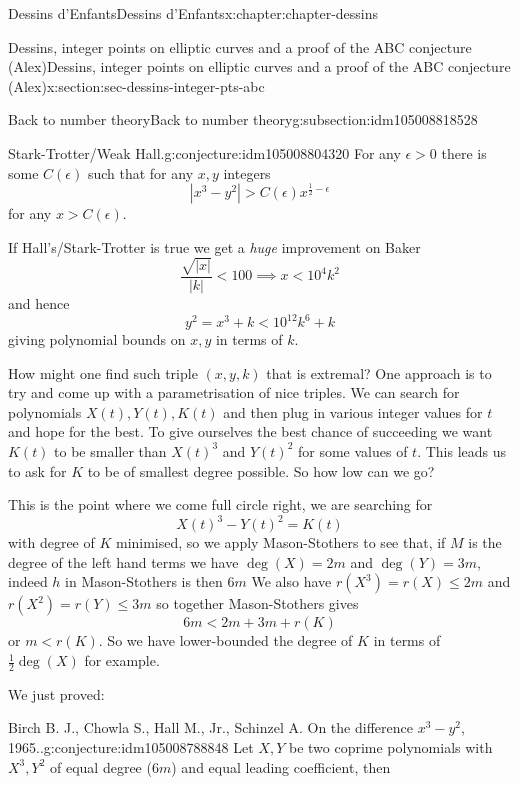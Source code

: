 \documentclass[oneside,10pt,]{book}
\numberwithin{equation}{section}
\newcommand{\lt}{<}
\newcommand{\gt}{>}
\begin{document}
\begin{chapterptx}{Dessins d'Enfants}{}{Dessins d'Enfants}{}{}{x:chapter:chapter-dessins}
\begin{sectionptx}{Dessins, integer points on elliptic curves and a proof of the ABC conjecture (Alex)}{}{Dessins, integer points on elliptic curves and a proof of the ABC conjecture (Alex)}{}{}{x:section:sec-dessins-integer-pts-abc}
\begin{subsectionptx}{Back to number theory}{}{Back to number theory}{}{}{g:subsection:idm105008818528}
\begin{conjecture}{Stark-Trotter\slash{}Weak Hall.}{}{g:conjecture:idm105008804320}%
For any  \(\epsilon \gt 0\) there is some \(C(\epsilon)\) such that for any \(x,y\) integers%
\begin{equation*}
|x^3 - y^2| \gt C(\epsilon) x^{\frac12 - \epsilon}
\end{equation*}
for any \(x \gt C(\epsilon)\).%
\end{conjecture}
If Hall's\slash{}Stark-Trotter is true we get a \emph{huge} improvement on Baker%
\begin{equation*}
\frac{\sqrt{|x|}}{|k|} \lt 100 \implies x \lt 10^4k^2
\end{equation*}
and hence%
\begin{equation*}
y^2 = x^3 + k \lt 10^{12}k^6 + k
\end{equation*}
giving polynomial bounds on \(x,y\) in terms of \(k\).%
\par
How might one find such triple \((x,y,k)\) that is extremal? One approach is to try and come up with a parametrisation of nice triples. We can search for polynomials \(X(t),Y(t), K(t)\) and then plug in various integer values for \(t\) and hope for the best. To give ourselves the best chance of succeeding we want \(K(t)\) to be smaller than \(X(t)^3\) and \(Y(t)^2\) for some values of \(t\). This leads us to ask for \(K\) to be of smallest degree possible. So how low can we go?%
\par
This is the point where we come full circle right, we are searching for%
\begin{equation*}
X(t)^3 - Y(t)^2 = K(t)
\end{equation*}
with degree of \(K\) minimised, so we apply Mason-Stothers to see that, if \(M\) is the degree of the left hand terms we have \(\deg(X) = 2m\) and \(\deg (Y) = 3m\), indeed \(h\) in Mason-Stothers is then \(6m\) We also have \(r(X^3) = r(X) \le 2m\) and \(r(X^2) = r(Y) \le 3m\) so together Mason-Stothers gives%
\begin{equation*}
6m \lt 2m + 3m + r(K)
\end{equation*}
or \(m \lt r(K)\). So we have lower-bounded the degree of \(K\) in terms of \(\frac 12 \deg(X)\) for example.%
\par
We just proved:%
\begin{conjecture}{Birch B. J., Chowla S., Hall M., Jr., Schinzel A. On the difference \(x^3 - y^2\), 1965..}{}{g:conjecture:idm105008788848}%
Let \(X, Y\) be two coprime polynomials with \(X^3,Y^2\) of equal degree (\(6m\)) and equal leading coefficient, then%

\end{conjecture}
\end{subsectionptx}
\end{sectionptx}
\end{chapterptx}
\end{document}
